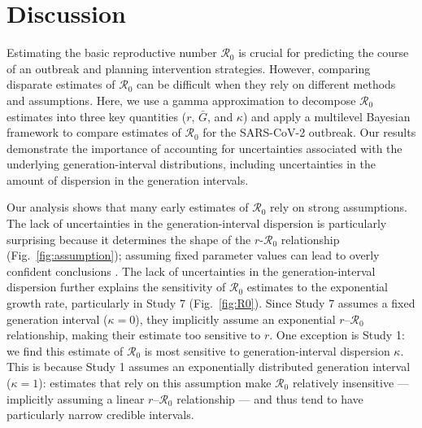 \documentclass[12pt]{article}
\newcommand{\fref}[1]{Fig.~\ref{fig:#1}}
\newcommand{\Ro}{\ensuremath{{\mathcal R}_{0}}\xspace}
\begin{document}
\section{Discussion}

Estimating the basic reproductive number \Ro is crucial for predicting the course of an outbreak and planning intervention strategies.
However, comparing disparate estimates of \Ro can be difficult when they rely on different methods and assumptions.
Here, we use a gamma approximation \citep{park2019practical} to decompose \Ro estimates into three key quantities ($r$, $\bar G$, and $\kappa$) and apply a multilevel Bayesian framework to compare estimates of \Ro for the SARS-CoV-2 outbreak.
Our results demonstrate the importance of accounting for uncertainties associated with the underlying generation-interval distributions, including uncertainties in the amount of dispersion in the generation intervals.

Our analysis shows that many early estimates of \Ro rely on strong assumptions.
The lack of uncertainties in the generation-interval dispersion is particularly surprising because it determines the shape of the $r$-\Ro relationship (\fref{assumption});
assuming fixed parameter values can lead to overly confident conclusions \citep{elderd2006uncertainty}.
The lack of uncertainties in the generation-interval dispersion further explains the sensitivity of \Ro estimates to the exponential growth rate, particularly in Study 7 (\fref{R0}).
Since Study 7 assumes a fixed generation interval ($\kappa=0$), they implicitly assume an exponential $r$--\Ro relationship, making their estimate too sensitive to $r$.
One exception is Study 1: we find this estimate of \Ro is most sensitive to generation-interval dispersion $\kappa$.
This is because Study 1 assumes an exponentially distributed generation interval ($\kappa=1$): estimates that rely on this assumption make \Ro relatively insensitive --- implicitly assuming a linear $r$--\Ro relationship --- and thus tend to have particularly narrow credible intervals.
\end{document}
